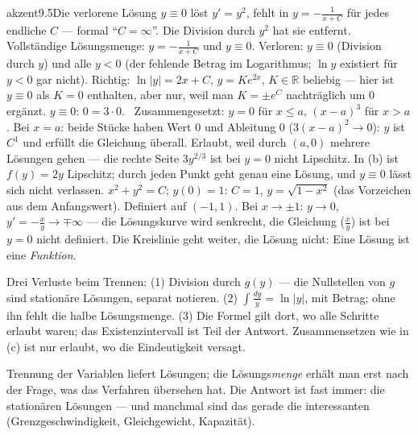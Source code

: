 \begin{loesungkarte}{akzent}{9.5}{Die verlorene Lösung}
$y\equiv0$ löst $y' = y^{2}$, fehlt in $y = -\frac1{x + C}$ für jedes endliche $C$ --- formal \enquote{$C = \infty$}. Die Division durch $y^{2}$ hat sie entfernt. Vollständige Lösungsmenge: $y = -\frac1{x + C}$ und $y\equiv0$.
Verloren: $y\equiv0$ (Division durch $y$) und alle $y < 0$ (der fehlende Betrag im Logarithmus; $\ln y$ existiert für $y < 0$ gar nicht). Richtig: $\ln|y| = 2x + C$, $y = Ke^{2x}$, $K\in\mathbb R$ beliebig --- hier ist $y\equiv0$ als $K = 0$ enthalten, aber nur, weil man $K = \pm e^{C}$ nachträglich um $0$ ergänzt.
$y\equiv0$: $0 = 3\cdot0$. \checkmark\ Zusammengesetzt: $y = 0$ für $x\le a$, $(x - a)^{3}$ für $x > a$. Bei $x = a$: beide Stücke haben Wert $0$ und Ableitung $0$ ($3(x - a)^{2}\to0$): $y$ ist $C^{1}$ und erfüllt die Gleichung überall. Erlaubt, weil durch $(a, 0)$ mehrere Lösungen gehen --- die rechte Seite $3y^{2/3}$ ist bei $y = 0$ nicht Lipschitz. In (b) ist $f(y) = 2y$ Lipschitz; durch jeden Punkt geht genau eine Lösung, und $y\equiv0$ lässt sich nicht verlassen.
$x^{2} + y^{2} = C$; $y(0) = 1$: $C = 1$, $y = \sqrt{1 - x^{2}}$ (das Vorzeichen aus dem Anfangswert). Definiert auf $(-1, 1)$. Bei $x\to\pm1$: $y\to0$, $y' = -\frac xy\to\mp\infty$ --- die Lösungskurve wird senkrecht, die Gleichung ($\frac xy$) ist bei $y = 0$ nicht definiert. Die Kreislinie geht weiter, die Lösung nicht: Eine Lösung ist eine \emph{Funktion}.
\begin{fehler}\kastentext
Drei Verluste beim Trennen: (1) Division durch $g(y)$ --- die Nullstellen von $g$ sind stationäre Lösungen, separat notieren. (2) $\int\frac{dy}y = \ln|y|$, mit Betrag; ohne ihn fehlt die halbe Lösungsmenge. (3) Die Formel gilt dort, wo alle Schritte erlaubt waren; das Existenzintervall ist Teil der Antwort. Zusammensetzen wie in (c) ist nur erlaubt, wo die Eindeutigkeit versagt.
\end{fehler}
\begin{mitnehmen}\kastentext
Trennung der Variablen liefert Lösungen; die Lösungs\emph{menge} erhält man erst nach der Frage, was das Verfahren übersehen hat. Die Antwort ist fast immer: die stationären Lösungen --- und manchmal sind das gerade die interessanten (Grenzgeschwindigkeit, Gleichgewicht, Kapazität).
\end{mitnehmen}
\end{loesungkarte}

